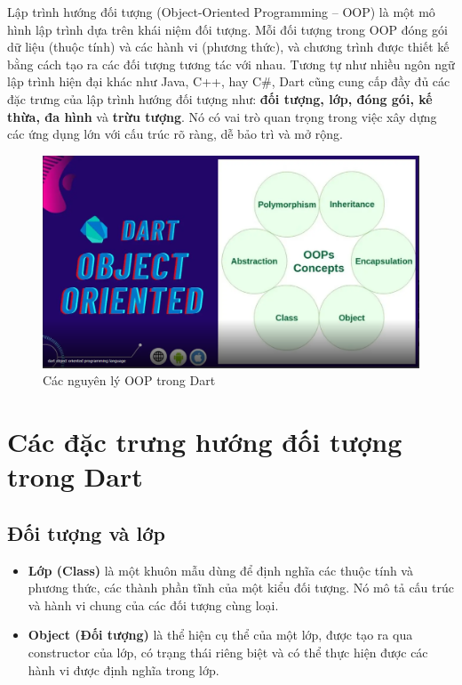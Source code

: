 \documentclass[../DoAn.tex]{subfiles}
\numberwithin{figure}{chapter}
\begin{document}
Lập trình hướng đối tượng (Object-Oriented Programming – OOP) là một mô hình lập trình dựa trên khái niệm đối tượng.  Mỗi đối tượng trong OOP đóng gói dữ liệu (thuộc tính) và các hành vi (phương thức), và chương trình được thiết kế bằng cách tạo ra các đối tượng tương tác với nhau.  Tương tự như nhiều ngôn ngữ lập trình hiện đại khác như Java, C++, hay C\#, Dart cũng cung cấp đầy đủ các đặc trưng của lập trình hướng đối tượng như: \textbf{đối tượng, lớp, đóng gói, kế thừa, đa hình} và \textbf{trừu tượng}. Nó có vai trò quan trọng trong việc xây dựng các ứng dụng lớn với cấu trúc rõ ràng, dễ bảo trì và mở rộng.

\begin{figure}[H]
    \centering
    \includegraphics[width=1\textwidth]{Hinhve/oopInDart.png}
    \caption{Các nguyên lý OOP trong Dart}
    \label{fig:oopindart}
\end{figure}

\section{Các đặc trưng hướng đối tượng trong Dart}
\subsection{Đối tượng và lớp}

\begin{itemize}
\item \textbf{Lớp (Class)} là một khuôn mẫu dùng để định nghĩa các thuộc tính và phương thức, các thành phần tĩnh của một kiểu đối tượng. Nó mô tả cấu trúc và hành vi chung của các đối tượng cùng loại.
\item \textbf{Object (Đối tượng)} là thể hiện cụ thể của một lớp, được tạo ra qua constructor của lớp, có trạng thái riêng biệt và có thể thực hiện được các hành vi được định nghĩa trong lớp.
\end{itemize}
\end{document}
